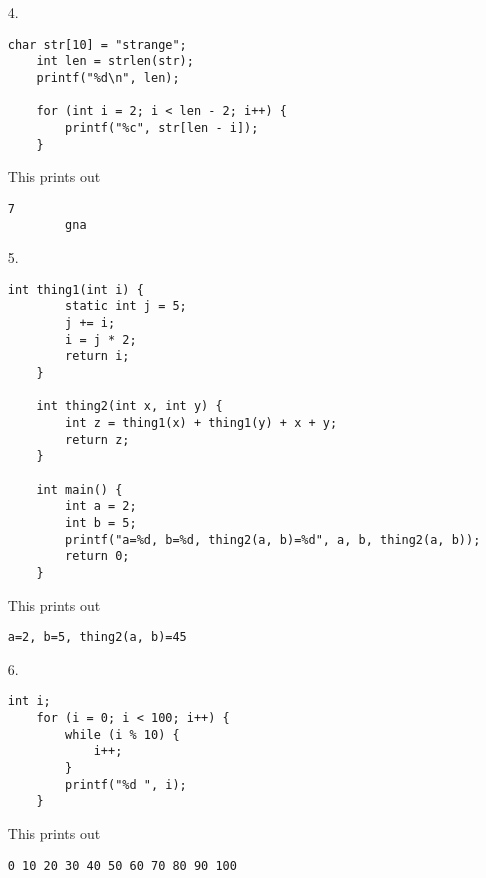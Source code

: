\documentclass{article}
\begin{document}
\begin{itemize}
	\item[4.] 
	\begin{lstlisting}[style=nonumbers]
	char str[10] = "strange";
	int len = strlen(str);
	printf("%d\n", len);

	for (int i = 2; i < len - 2; i++) {
		printf("%c", str[len - i]);
	}
	\end{lstlisting}
	\begin{answer*}
		This prints out
		\begin{lstlisting}[style=nonumbers]
		7
		gna
		\end{lstlisting}
	\end{answer*}
	
	\item[5.] 
	\begin{lstlisting}[style=nonumbers]
	int thing1(int i) {
		static int j = 5;
		j += i;
		i = j * 2;
		return i;
	}

	int thing2(int x, int y) {
		int z = thing1(x) + thing1(y) + x + y;
		return z;
	}

	int main() {
		int a = 2;
		int b = 5;
		printf("a=%d, b=%d, thing2(a, b)=%d", a, b, thing2(a, b));
		return 0;
	}
	\end{lstlisting}
	\begin{answer*}
		This prints out
		\begin{lstlisting}[style=nonumbers]
		a=2, b=5, thing2(a, b)=45
		\end{lstlisting}
	\end{answer*}
		
	\item[6.] 
	\begin{lstlisting}[style=nonumbers]
	int i;
	for (i = 0; i < 100; i++) {
		while (i % 10) {
			i++;
		}
		printf("%d ", i);
	}
	\end{lstlisting}
	\begin{answer*}
		This prints out 
		\begin{lstlisting}[style=nonumbers]
		0 10 20 30 40 50 60 70 80 90 100
		\end{lstlisting}
		
	\end{answer*}

\end{itemize}
\end{document}
